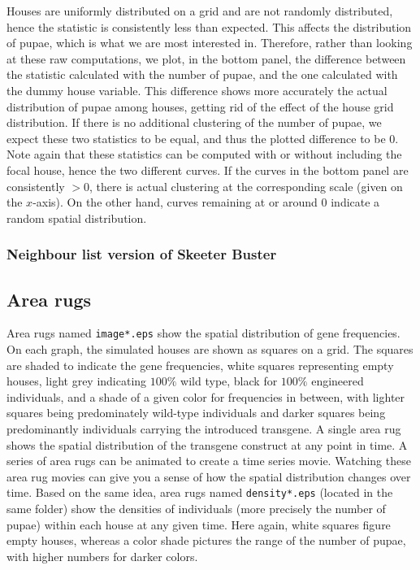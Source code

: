 \documentclass[11pt]{article}
\newcommand{\linecmd}[1]{\texttt{#1}}
\begin{document}
Houses are uniformly distributed on a grid and are not randomly distributed, hence the statistic is consistently less than expected. This affects the distribution of pupae, which is what we are most interested in. Therefore, rather than looking at these raw computations, we plot, in the bottom panel, the difference between the statistic calculated with the number of pupae, and the one calculated with the dummy house variable. This difference shows more accurately the actual distribution of pupae among houses, getting rid of the effect of the house grid distribution. If there is no additional clustering of the number of pupae, we expect these two statistics to be equal, and thus the plotted difference to be 0. Note again that these statistics can be computed with or without including the focal house, hence the two different curves. If the curves in the bottom panel are consistently $>0$, there is actual clustering at the corresponding scale (given on the $x$-axis). On the other hand, curves remaining at or around 0 indicate a random spatial distribution.

\subsubsection{Neighbour list version of Skeeter Buster}


\subsection{Area rugs}

Area rugs named \linecmd{image*.eps} show the spatial distribution of gene frequencies. On each graph, the simulated houses are shown as squares on a grid. The squares are shaded to indicate the gene frequencies, white squares representing empty houses, light grey indicating $100\%$ wild type, black for $100\%$ engineered individuals, and a shade of a given color for frequencies in between, with lighter squares being predominately wild-type individuals and darker squares being predominantly individuals carrying the introduced transgene. A single area rug shows the spatial distribution of the transgene construct at any point in time. A series of area rugs can be animated to create a time series movie. Watching these area rug movies can give you a sense of how the spatial distribution changes over time. Based on the same idea, area rugs named \linecmd{density*.eps} (located in the same folder) show the densities of individuals (more precisely the number of pupae) within each house at any given time. Here again, white squares figure empty houses, whereas a color shade pictures the range of the number of pupae, with higher numbers for darker colors.
\end{document}
